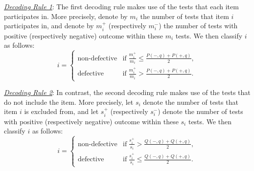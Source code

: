 \documentclass[onecolumn,letterpaper]{IEEEtran}
\newcommand{\cN}{{\cal N}}
\newcommand{\cp}{{q}}
\newcommand{\nt}{{m}}
\newcommand{\nti}{{\nt_{i}}}
\newcommand{\ntip}{{\nt_{i}^+}}
\newcommand{\ntin}{{\nt_{i}^-}}
\newcommand{\mo}{{s}}
\newcommand{\moi}{{\mo_{i}}}
\newcommand{\moip}{{\mo_{i}^+}}
\newcommand{\moin}{{\mo_{i}^-}}
\newcommand{\pn}{{P(-,\cp)}}
\newcommand{\pp}{{P(+,\cp)}}
\newcommand{\pnm}{{Q(-,\cp)}}
\newcommand{\ppm}{{Q(+,\cp)}}
\begin{document}
{\underline{\it Decoding Rule 1}:} The first decoding rule makes use of the tests that each item participates in. More precisely, denote by $\nti$ the number of tests that item $i$ participates in, and denote by $\ntip$ (respectively $\ntin$) the number of tests with positive (respectively negative) outcome within these $\nti$ tests. We then classify $i$ as follows:
\begin{equation} \label{eq:classification_small_q}
    i =
    \left\{
    \begin{array}{ll}
    \text{non-defective} & \text{if} \; \frac{\ntip}{\nti} \le \frac{\pn+\pp}{2}, \\
    \text{defective}     & \text{if} \; \frac{\ntip}{\nti} > \frac{\pn+\pp}{2}.
    \end{array}
    \right.
\end{equation}

{\underline{\it Decoding Rule 2}:} In contrast, the second decoding rule makes use of the tests that do not include the item. More precisely, let $\moi$ denote the number of tests that item $i$ is excluded from, and let $\moip$ (respectively $\moin$) denote the number of tests with positive (respectively negative) outcome within these $\moi$ tests. We then classify $i$ as follows:
\begin{equation} \label{eq:classification_large_q}
    i =
    \left\{
    \begin{array}{ll}
    \text{non-defective} & \text{if} \; \frac{\moip}{\moi} > \frac{\pnm+\ppm}{2}, \\
    \text{defective}     & \text{if} \; \frac{\moip}{\moi} \le \frac{\pnm+\ppm}{2}.
    \end{array}
    \right.
\end{equation}
\end{document}
